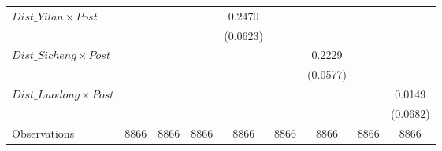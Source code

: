 {\begin{tabular}{l*{8}{c}}
\addlinespace
$ Dist\_Yilan \times Post$&                  &                  &                  &   0.2470\sym{***}&                  &                  &                  &                  \\
                &                  &                  &                  & (0.0623)         &                  &                  &                  &                  \\
\addlinespace
$ Dist\_Sicheng \times Post$&                  &                  &                  &                  &                  &   0.2229\sym{***}&                  &                  \\
                &                  &                  &                  &                  &                  & (0.0577)         &                  &                  \\
\addlinespace
$ Dist\_Luodong \times Post$&                  &                  &                  &                  &                  &                  &                  &   0.0149         \\
                &                  &                  &                  &                  &                  &                  &                  & (0.0682)         \\
\midrule
Observations    &     8866         &     8866         &     8866         &     8866         &     8866         &     8866         &     8866         &     8866         \\
\bottomrule
\end{tabular}
}

